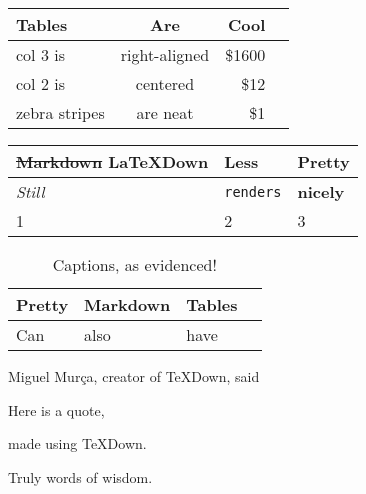 \documentclass{article}
\begin{document}
\vspace{5mm}

\begin{table}[h!tpb]
\begingroup
\setlength{\tabcolsep}{10pt}
\renewcommand{\arraystretch}{1.5}
\begin{tabular}{ |l|c|r|l| }
\hline
Tables & Are & Cool \\ \hline \hline
col 3 is & right-aligned & \$1600 \\ \hline
col 2 is & centered & \$12 \\ \hline
zebra stripes & are neat & \$1 \\ \hline
\end{tabular}
\label{table1}
\endgroup
\end{table}

\vspace{5mm}

\begin{table}[h!tpb]
\begingroup
\setlength{\tabcolsep}{10pt}
\renewcommand{\arraystretch}{1.5}
\begin{tabular}{ |l|l|l| }
\hline
\sout{Markdown} \LaTeX{}Down & Less & Pretty \\ \hline \hline
\emph{Still} & \lstinline[columns=fixed]$renders$ & \textbf{nicely} \\ \hline
1 & 2 & 3 \\ \hline
\end{tabular}
\label{table3}
\endgroup
\end{table}

\begin{table}[h!tpb]
\begingroup
\setlength{\tabcolsep}{10pt}
\renewcommand{\arraystretch}{1.5}
\begin{tabular}{ |l|l|l|l| }
\hline
Pretty & Markdown & Tables \\ \hline \hline
Can & also & have \\ \hline
\end{tabular}
\label{table2}
\caption{Captions, as evidenced!}
\endgroup
\end{table}

\vspace{5mm}

Miguel Murça, creator of TeXDown, said
\begin{displayquote}
Here is a quote,

made using TeXDown.
\end{displayquote}
Truly words of wisdom.
\end{document}
